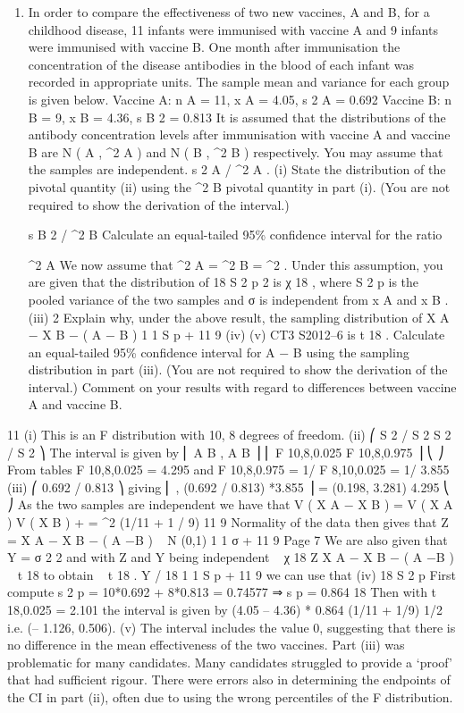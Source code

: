 \documentclass[a4paper,12pt]{article}
\begin{document}
\begin{enumerate}
\item 
In order to compare the effectiveness of two new vaccines, A and B, for a childhood
disease, 11 infants were immunised with vaccine A and 9 infants were immunised
with vaccine B. One month after immunisation the concentration of the disease
antibodies in the blood of each infant was recorded in appropriate units. The sample
mean and variance for each group is given below.
Vaccine A: n A = 11, x A = 4.05, s 2 A = 0.692
Vaccine B: n B = 9, x B = 4.36, s B 2 = 0.813
It is assumed that the distributions of the antibody concentration levels after
immunisation with vaccine A and vaccine B are N ( \mu A , \sigma^2 A ) and N ( \mu B , \sigma^2 B )
respectively. You may assume that the samples are independent.
s 2 A / \sigma^2 A
.
(i) State the distribution of the pivotal quantity
(ii) using the
\sigma^2 B
pivotal quantity in part (i). (You are not required to show the derivation of the
interval.)

s B 2 / \sigma^2 B
Calculate an equal-tailed 95\% confidence interval for the ratio

\sigma^2 A
We now assume that \sigma^2 A = \sigma^2 B = \sigma^2 . Under this assumption, you are given that the
distribution of
18 S 2 p
2
is χ 18
, where S 2 p is the pooled variance of the two samples and
σ
is independent from x A and x B .
(iii)
2
Explain why, under the above result, the sampling distribution of
X A − X B − ( \mu A − \mu B )
1 1
S p
+
11 9
(iv)
(v)
CT3 S2012–6
is t 18 . 
Calculate an equal-tailed 95\% confidence interval for \mu A − \mu B using the
sampling distribution in part (iii). (You are not required to show the
derivation of the interval.) 
Comment on your results with regard to differences between vaccine A and
vaccine B.
\end{enumerate}
\newpage

11
(i) This is an F distribution with 10, 8 degrees of freedom.
(ii) ⎛ S 2 / S 2
S 2 / S 2 ⎞
The interval is given by ⎜ A B , A B ⎟
⎜ F 10,8,0.025 F 10,8,0.975 ⎟
⎝
⎠
From tables F 10,8,0.025 = 4.295 and F 10,8,0.975 = 1/ F 8,10,0.025 = 1/ 3.855
(iii)
⎛ 0.692 / 0.813
⎞
giving ⎜
, (0.692 / 0.813) *3.855 ⎟ = (0.198, 3.281)
4.295
⎝
⎠
As the two samples are independent we have that
V ( X A − X B ) =
V ( X A ) V ( X B )
+
= \sigma^2 (1/11 + 1 / 9)
11
9
Normality of the data then gives that Z =
X A − X B − ( \mu A −\mu B )
~ N (0,1)
1 1
σ
+
11 9
Page 7%
We are also given that Y =
σ
2
2
and with Z and Y being independent
~ χ 18
Z
X A − X B − ( \mu A −\mu B )
~ t 18 to obtain
~ t 18 .
Y / 18
1 1
S p
+
11 9
we can use that
(iv)
18 S 2 p
First compute s 2 p =
10*0.692 + 8*0.813
= 0.74577 ⇒ s p = 0.864
18
Then with t 18,0.025 = 2.101 the interval is given by (4.05 – 4.36)  *
0.864 (1/11 + 1/9) 1/2 i.e. (– 1.126, 0.506).
(v)
The interval includes the value 0, suggesting that there is no difference in the
mean effectiveness of the two vaccines.
Part (iii) was problematic for many candidates. Many candidates struggled to provide a
‘proof’ that had sufficient rigour. There were errors also in determining the endpoints of the
CI in part (ii), often due to using the wrong percentiles of the F distribution.
\end{document}
